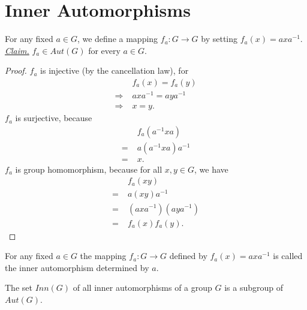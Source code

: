 \documentclass[../main-sheet.tex]{subfiles}
\begin{document}
\section{Inner Automorphisms}
For any fixed \(a\in G\), we define a mapping \(f_a:G\to G\) by setting \(f_a(x)=axa^{-1}\).\\
\emph{\underline{Claim.}} \(f_a\in Aut(G)\) for every \(a\in G\).
\begin{proof}
    \(f_a\) is injective (by the cancellation law), for
    \begin{align*}
        &f_a(x)=f_a(y)\\
        \Rightarrow\; &axa^{-1}=aya^{-1}\\
        \Rightarrow\;&x=y.
    \end{align*}
    \(f_a\) is surjective, because
    \begin{align*}
        &f_a(a^{-1}xa)\\
        =\;&a(a^{-1}xa)a^{-1}\\
        =\;&x.
    \end{align*}
    \(f_a\) is group homomorphism, because for all \(x,y\in G\), we have
    \begin{align*}
        &f_a(xy)\\
        =\;&a(xy)a^{-1}\\
        =\;&(axa^{-1})(aya^{-1})\\
        =\;&f_a(x)f_a(y).
    \end{align*}
\end{proof}
\begin{defn}
    For any fixed \(a\in G\) the mapping \(f_a:G\to G\) defined by \(f_a(x)=axa^{-1}\) is called the inner automorphism determined by \(a\).
\end{defn}
\begin{thm}
    The  set \(Inn(G)\) of all inner  automorphisms of a group \(G\)  is a
    subgroup of \(Aut(G)\).
\end{thm}
\end{document}
